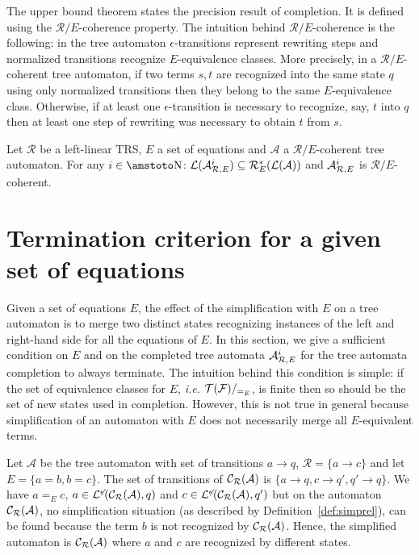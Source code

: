 \documentclass[a4paper,11pt]{llncs}
\newcommand{\A}{\mathcal{A}}
\def \R {\mathcal{R}}
\renewcommand{\varepsilon}{\epsilon}
\newcommand{\epsifree}{\smash{\not}\varepsilon}
\newcommand{\Lang}{\mathcal{L}}
\newcommand{\Lange}{\mathcal{L}^{\epsifree}}
\newcommand{\desc}{\R^*}
\newcommand{\TF}{{\cal T(F)}}
\newcommand{\rw}{\rightarrow}
\newcommand{\nr}{E}
\newcommand{\comp}{{\cal C}}
\newcommand{\aapprox}{{\cal A}_{\R, \nr}}
\newcommand{\NN}{\mbox{\amstoto\char'116}}
\theoremstyle{plain}
\begin{document}
\noindent
The upper bound theorem states the precision result of
completion. It is defined using the $\R/E$-coherence property.
The intuition behind $\R/E$-coherence is the following: in the tree automaton
$\varepsilon$-transitions represent rewriting steps and normalized transitions
recognize $E$-equivalence classes. More precisely, in a $\R/E$-coherent tree
automaton, if two terms $s,t$ are recognized into the same state $q$  using
only normalized transitions then they belong to 
the same $E$-equivalence class. Otherwise, if at least one
$\varepsilon$-transition is necessary to recognize, say, $t$ into $q$ then at
least one step of rewriting was necessary to obtain $t$ from $s$. 


\begin{theorem}
  \label{correctness}
  Let $\R$ be a left-linear TRS, $E$ a set of equations and $\A$ a
  $\R/E$-coherent tree automaton. For any $i\in\NN$:
$\Lang(\aapprox^i)\subseteq \desc_E(\Lang(\A))$ and $\aapprox^i$ is $\R/E$-coherent. \end{theorem}




\section{Termination criterion for a given set of equations}
\label{sec:termCrit}
\renewcommand{\desc}{\R^*}

Given a set of
equations $E$, the effect of the simplification with $E$ on a tree automaton is
to merge two distinct states recognizing instances of the left and right-hand
side for all the equations of $E$. In this section, we give a sufficient
condition on $E$ and on the completed tree automata $\aapprox^i$ for the tree
automata completion to always terminate. The intuition behind this condition is
simple: if the set of equivalence classes for $E$, {\em i.e.} $\TF/_{=_E}$,  is finite then so should be
the set of new states used in completion. However, this is not true in general
because simplification of an automaton with $E$ does not necessarily merge all
$E$-equivalent terms.

\begin{example}
\label{ex:compNotEcompat}
  Let $\A$ be the tree automaton with set of transitions $a \rw q$, $\R=\{a \rw
  c\}$ and let $E=\{a=b,b=c\}$. The set of transitions of $\comp_\R(\A)$ is $\{a
  \rw q, c \rw q', q' \rw q\}$. We have $a =_E c$, $a \in
  \Lange(\comp_\R(\A),q)$ and $c \in \Lange(\comp_\R(\A),q')$ but on the
  automaton $\comp_\R(\A)$, no simplification situation (as described by
  Definition~\ref{def:simprel}), can be found because the term $b$ is not
  recognized by $\comp_\R(\A)$. Hence, the simplified automaton is
  $\comp_\R(\A)$ where $a$ and $c$ are recognized by different states.
\end{example}
\end{document}

